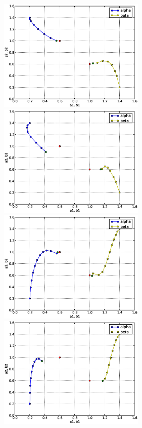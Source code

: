 \begin{figure}
  \begin{center}
    \includegraphics[width=7cm]{chapters/schroll/eps/4Dscan1b.eps}
    \includegraphics[width=7cm]{chapters/schroll/eps/4Dscan1b-5.eps}
    \includegraphics[width=7cm]{chapters/schroll/eps/4Dscan2b.eps}
    \includegraphics[width=7cm]{chapters/schroll/eps/4Dscan2b-5.eps}

\end{center}
\end{figure}
